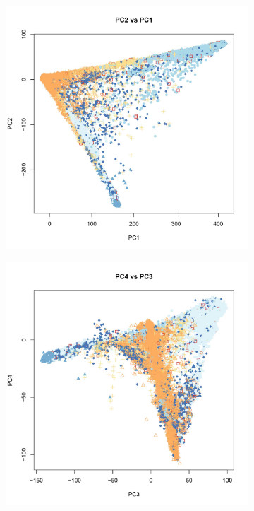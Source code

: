 \documentclass[a4paper,12pt]{article}
\begin{document}
\begin{figure}[h]
\begin{subfigure}{.32\textwidth}
  \centering
  \includegraphics[width=\linewidth]{pca1_2.jpg}
  \label{fig:sfig1}
\end{subfigure}
\begin{subfigure}{.32\textwidth}
  \centering
  \includegraphics[width=\linewidth]{pca3_4.jpg}

\end{subfigure}
\end{figure}
\end{document}
